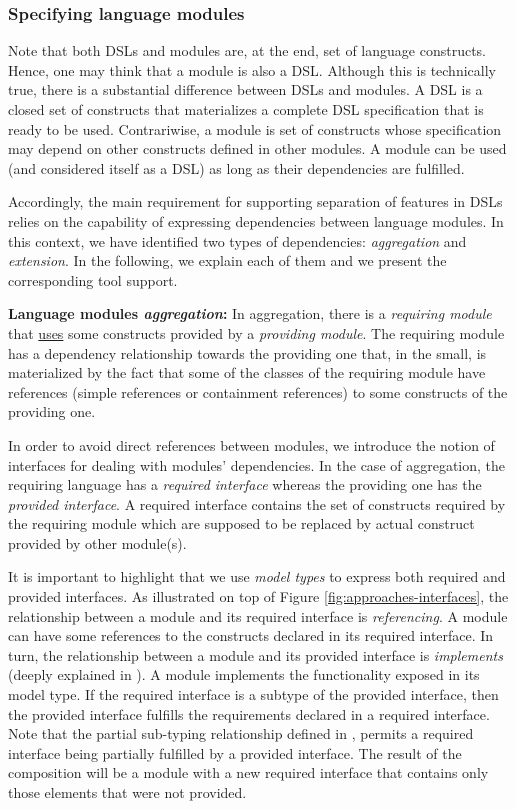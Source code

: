 \subsubsection{Specifying language modules}

Note that both DSLs and modules are, at the end, set of language constructs. Hence, one may think that a module is also a DSL. Although this is technically true, there is a substantial difference between DSLs and modules. A DSL is a closed set of constructs that materializes a complete DSL specification that is ready to be used. Contrariwise, a module is set of constructs whose specification may depend on other constructs defined in other modules. A module can be used (and considered itself as a DSL) as long as their dependencies are fulfilled.

Accordingly, the main requirement for supporting separation of features in DSLs relies on the capability of expressing dependencies between language modules. In this context, we have identified two types of dependencies: \textit{aggregation} and \textit{extension}. In the following, we explain each of them and we present the corresponding tool support.

\textbf{Language modules \textit{aggregation}:} In aggregation, there is a \textit{requiring module} that \underline{uses} some constructs provided by a \textit{providing module}. The requiring module has a dependency relationship towards the providing one that, in the small, is materialized by the fact that some of the classes of the requiring module have references (simple references or containment references) to some constructs of the providing one.

In order to avoid direct references between modules, we introduce the notion of interfaces for dealing with modules' dependencies. In the case of aggregation, the requiring language has a \textit{required interface} whereas the providing one has the \textit{provided interface}. A required interface contains the set of constructs required by the requiring module which are supposed to be replaced by actual construct provided by other module(s).

It is important to highlight that we use \textit{model types} \cite{Steel:2007} to express both required and provided interfaces. As illustrated on top of Figure \ref{fig:approaches-interfaces}, the relationship between a module and its required interface is \textit{referencing}. A module can have some references to the constructs declared in its required interface. In turn, the relationship between a module and its provided interface is \textit{implements} (deeply explained in \cite{Degueule:2015}). A module implements the functionality exposed in its model type. If the required interface is a subtype of the provided interface, then the provided interface fulfills the requirements declared in a required interface. Note that the partial sub-typing relationship defined in \cite{Guy:2012}, permits a required interface being partially fulfilled by a provided interface. The result of the composition will be a module with a new required interface that contains only those elements that were not provided.


